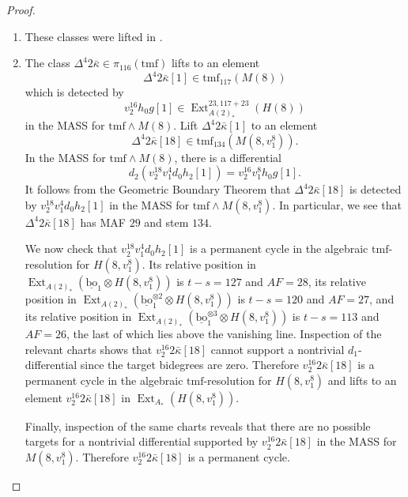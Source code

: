 \documentclass[10pt]{amsart}
\newcommand{\ul}[1]{\underline{#1}}
\newcommand{\tmf}{\mathrm{tmf}}
\newcommand{\bo}{\mathrm{bo}}
\newcommand{\bou}{\ul{\bo}}
\theoremstyle{definition}
\numberwithin{equation}{section}
\numberwithin{figure}{section}
\DeclareMathOperator{\Ext}{Ext}
\begin{document}
\begin{proof}$\quad$

\begin{enumerate}

\item These classes were lifted in \cite[Thm. 11.1]{BHHM2}. 
\vspace{10pt}

\item The class $\Delta^4 2 \bar{\kappa} \in \pi_{116}(\tmf)$ lifts to an element 
$$\Delta^4 2 \bar{\kappa}[1] \in \tmf_{117}(M(8))$$
which is detected by 
$$v_2^{16} h_0 g[1] \in \Ext^{23,117+23}_{A(2)_*}(H(8))$$
in the MASS for $\tmf \wedge M(8)$. Lift $\Delta^4 2 \bar{\kappa}[1]$ to an element 
$$\Delta^4 2 \bar{\kappa}[18] \in \tmf_{134}(M(8,v_1^8)).$$
In the MASS for $\tmf \wedge M(8)$, there is a differential 
$$d_2(v_2^{18} v_1^4 d_0 h_2[1]) = v_2^{16} v_1^8 h_0 g [1].$$ 
It follows from the Geometric Boundary Theorem that $\Delta^4 2 \bar{\kappa}[18]$ is detected by $v_2^{18} v_1^4 d_0 h_2[1]$ in the MASS for $\tmf \wedge M(8,v_1^8)$. In particular, we see that $\Delta^4 2\bar{\kappa}[18]$ has MAF $29$ and stem $134$. 

We now check that $v_2^{18} v_1^4 d_0 h_2[1]$ is a permanent cycle in the algebraic $\tmf$-resolution for $H(8,v_1^8)$. Its relative position in $\Ext_{A(2)_*}(\bou_1 \otimes H(8,v_1^8))$ is $t-s = 127$ and $AF = 28$, its relative position in $\Ext_{A(2)_*}(\bou_1^{\otimes 2} \otimes H(8,v_1^8))$ is $t-s = 120$ and $AF = 27$, and its relative position in $\Ext_{A(2)_*}(\bou_1^{\otimes 3} \otimes H(8,v_1^8))$ is $t-s = 113$ and $AF = 26$, the last of which lies above the vanishing line. Inspection of the relevant charts shows that $v_2^{16} 2 \bar{\kappa}[18]$ cannot support a nontrivial $d_1$-differential since the target bidegrees are zero. Therefore $v_2^{16} 2 \bar{\kappa}[18]$ is a permanent cycle in the algebraic $\tmf$-resolution for $H(8,v_1^8)$ and lifts to an element $v_2^{16} 2 \bar{\kappa}[18]$ in $\Ext_{A_*}(H(8,v_1^8))$. 

Finally, inspection of the same charts reveals that there are no possible targets for a nontrivial differential supported by $v_2^{16} 2 \bar{\kappa}[18]$ in the MASS for $M(8,v_1^8)$. Therefore $v_2^{16} 2 \bar{\kappa}[18]$ is a permanent cycle. 



\end{enumerate} 

\end{proof}
\end{document}
